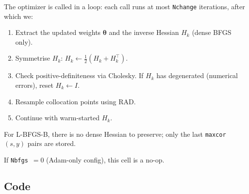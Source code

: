 \documentclass[11pt,a4paper]{article}
\begin{document}
The optimizer is called in a loop: each call runs at most
\texttt{Nchange} iterations, after which we:
\begin{enumerate}[nosep]
  \item Extract the updated weights $\bm\theta$ and the inverse
        Hessian $H_k$ (dense BFGS only).
  \item Symmetrise $H_k$: $H_k \leftarrow \frac{1}{2}(H_k + H_k^\top)$.
  \item Check positive-definiteness via Cholesky.  If $H_k$ has
        degenerated (numerical errors), reset $H_k \leftarrow I$.
  \item Resample collocation points using RAD.
  \item Continue with warm-started $H_k$.
\end{enumerate}

For L-BFGS-B, there is no dense Hessian to preserve; only the last
\texttt{maxcor} $(s,y)$ pairs are stored.

If \texttt{Nbfgs}~$=0$ (Adam-only config), this cell is a no-op.

\subsection*{Code}
\end{document}
